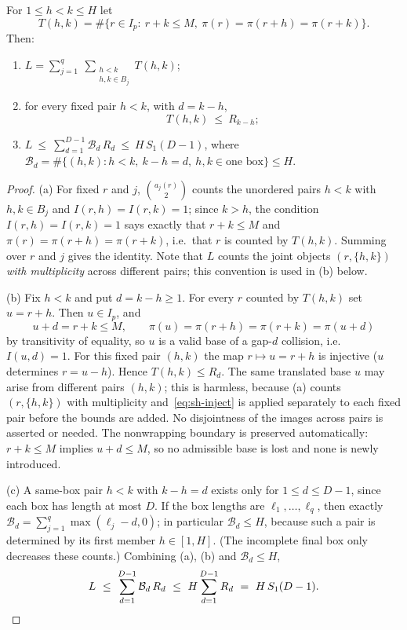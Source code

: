 \begin{lemma}\label{lem:sh-inject}
For $1\le h<k\le H$ let
\[
 T(h,k)=\#\{r\in I_p:\ r+k\le M,\ \pi(r)=\pi(r+h)=\pi(r+k)\}.
\]
Then:
\begin{enumerate}
\item[(a)] $\displaystyle
 L=\sum_{j=1}^{q}\ \sum_{\substack{h<k\\ h,k\in B_j}}T(h,k)$;
\item[(b)] for every fixed pair $h<k$, with $d=k-h$,
 \begin{equation}\label{eq:sh-inject}
  T(h,k)\ \le\ R_{k-h};
 \end{equation}
\item[(c)] $\displaystyle L\ \le\ \sum_{d=1}^{D-1}\mathcal B_d\,R_d
 \ \le\ H\,S_1(D-1)$, where
 $\mathcal B_d=\#\{(h,k):h<k,\ k-h=d,\ h,k\in\text{one box}\}\le H$.
\end{enumerate}
\end{lemma}

\begin{proof}
(a) For fixed $r$ and $j$, $\binom{a_j(r)}{2}$ counts the unordered pairs
$h<k$ with $h,k\in B_j$ and $I(r,h)=I(r,k)=1$; since $k>h$, the condition
$I(r,h)=I(r,k)=1$ says exactly that $r+k\le M$ and
$\pi(r)=\pi(r+h)=\pi(r+k)$, i.e.\ that $r$ is counted by $T(h,k)$.
Summing over $r$ and $j$ gives the identity.  Note that $L$ counts the
joint objects $(r,\{h,k\})$ \emph{with multiplicity} across different
pairs; this convention is used in (b) below.

(b) Fix $h<k$ and put $d=k-h\ge1$.  For every $r$ counted by $T(h,k)$
set $u=r+h$.  Then $u\in I_p$, and
\[
 u+d=r+k\le M,
 \qquad
 \pi(u)=\pi(r+h)=\pi(r+k)=\pi(u+d)
\]
by transitivity of equality, so $u$ is a valid base of a gap-$d$
collision, i.e.\ $I(u,d)=1$.  For this fixed pair $(h,k)$ the map
$r\mapsto u=r+h$ is injective ($u$ determines $r=u-h$).
Hence $T(h,k)\le R_d$.  The same translated base $u$ may arise from
different pairs $(h,k)$; this is harmless, because (a) counts
$(r,\{h,k\})$ with multiplicity and~\eqref{eq:sh-inject} is applied
separately to each fixed pair before the bounds are added.  No
disjointness of the images across pairs is asserted or needed.  The
nonwrapping boundary is preserved automatically:
$r+k\le M$ implies $u+d\le M$, so no admissible base is lost and none is
newly introduced.

(c) A same-box pair $h<k$ with $k-h=d$ exists only for $1\le d\le D-1$,
since each box has length at most $D$.  If the box lengths are
$\ell_1,\ldots,\ell_q$, then exactly
$\mathcal B_d=\sum_{j=1}^{q}\max(\ell_j-d,0)$; in particular
$\mathcal B_d\le H$, because such a pair is determined by its first
member $h\in[1,H]$.  (The incomplete final box only decreases these
counts.)  Combining (a), (b) and $\mathcal B_d\le H$,
\[
 L\ \le\ \sum_{d=1}^{D-1}\mathcal B_d\,R_d
 \ \le\ H\sum_{d=1}^{D-1}R_d\ =\ H\,S_1(D-1). \qedhere
\]
\end{proof}

